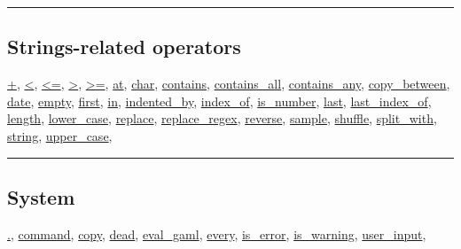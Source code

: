 \documentclass[]{book}
\theoremstyle{definition}
\theoremstyle{definition}
\theoremstyle{definition}
\theoremstyle{remark}
\begin{document}
\begin{center}\rule{0.5\linewidth}{\linethickness}\end{center}

\subsection{Strings-related operators}\label{strings-related-operators}

\href{operators-a-to-a.html\#+}{+},
\href{operators-a-to-a.html\#\%3C}{\textless{}},
\href{operators-a-to-a.html\#\%3C=}{\textless{}=},
\href{operators-a-to-a.html\#\%3E}{\textgreater{}},
\href{operators-a-to-a.html\#\%3E=}{\textgreater{}=},
\href{operators-a-to-a.html\#at}{at},
\href{operators-b-to-c.html\#char}{char},
\href{operators-b-to-c.html\#contains}{contains},
\href{operators-b-to-c.html\#contains_all}{contains\_all},
\href{operators-b-to-c.html\#contains_any}{contains\_any},
\href{operators-b-to-c.html\#copy_between}{copy\_between},
\href{operators-d-to-h.html\#date}{date},
\href{operators-d-to-h.html\#empty}{empty},
\href{operators-d-to-h.html\#first}{first},
\href{operators-i-to-m.html\#in}{in},
\href{operators-i-to-m.html\#indented_by}{indented\_by},
\href{operators-i-to-m.html\#index_of}{index\_of},
\href{operators-i-to-m.html\#is_number}{is\_number},
\href{operators-i-to-m.html\#last}{last},
\href{operators-i-to-m.html\#last_index_of}{last\_index\_of},
\href{operators-i-to-m.html\#length}{length},
\href{operators-i-to-m.html\#lower_case}{lower\_case},
\href{operators-n-to-r.html\#replace}{replace},
\href{operators-n-to-r.html\#replace_regex}{replace\_regex},
\href{operators-n-to-r.html\#reverse}{reverse},
\href{operators-s-to-z.html\#sample}{sample},
\href{operators-s-to-z.html\#shuffle}{shuffle},
\href{operators-s-to-z.html\#split_with}{split\_with},
\href{operators-s-to-z.html\#string}{string},
\href{operators-s-to-z.html\#upper_case}{upper\_case},

\begin{center}\rule{0.5\linewidth}{\linethickness}\end{center}

\subsection{System}\label{system}

\href{operators-a-to-a.html\#.}{.},
\href{operators-b-to-c.html\#command}{command},
\href{operators-b-to-c.html\#copy}{copy},
\href{operators-d-to-h.html\#dead}{dead},
\href{operators-d-to-h.html\#eval_gaml}{eval\_gaml},
\href{operators-d-to-h.html\#every}{every},
\href{operators-i-to-m.html\#is_error}{is\_error},
\href{operators-i-to-m.html\#is_warning}{is\_warning},
\href{operators-s-to-z.html\#user_input}{user\_input},
\end{document}
